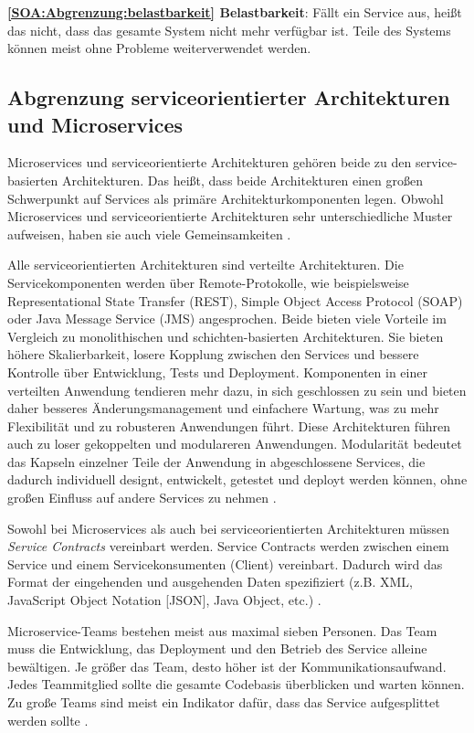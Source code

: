 \textbf{\ref{SOA:Abgrenzung:belastbarkeit} Belastbarkeit}: Fällt ein Service aus, heißt das nicht, dass das gesamte System nicht mehr verfügbar ist. Teile des Systems können meist ohne Probleme weiterverwendet werden.



\subsection{Abgrenzung serviceorientierter Architekturen und Microservices}
\label{subsec: AbgrenzungServiceorientierte}
Microservices und serviceorientierte Architekturen gehören beide zu den service-basierten Architekturen. Das heißt, dass beide Architekturen einen großen Schwerpunkt auf Services als primäre Architekturkomponenten legen. Obwohl Microservices und serviceorientierte Architekturen sehr unterschiedliche Muster aufweisen, haben sie auch viele Gemeinsamkeiten \cite{MicroservicesVSSOA}.

Alle serviceorientierten Architekturen sind verteilte Architekturen. Die Servicekomponenten werden über Remote-Protokolle, wie beispielsweise Representational State Transfer (REST), Simple Object Access Protocol (SOAP) oder Java Message Service (JMS) angesprochen.
Beide bieten viele Vorteile im Vergleich zu monolithischen und schichten-basierten Architekturen. Sie bieten höhere Skalierbarkeit, losere Kopplung zwischen den Services und bessere Kontrolle über Entwicklung, Tests und Deployment. Komponenten in einer verteilten Anwendung tendieren mehr dazu, in sich geschlossen zu sein und bieten daher besseres Änderungsmanagement und einfachere Wartung, was zu mehr Flexibilität und zu robusteren Anwendungen führt.
Diese Architekturen führen auch zu loser gekoppelten und modulareren Anwendungen. 
Modularität bedeutet das Kapseln einzelner Teile der Anwendung in abgeschlossene Services, die dadurch individuell designt, entwickelt, getestet und deployt werden können, ohne großen Einfluss auf andere Services zu nehmen \cite{MicroservicesVSSOA}.

Sowohl bei Microservices als auch bei serviceorientierten Architekturen müssen \textit{Service Contracts} vereinbart werden. Service Contracts werden zwischen einem Service und einem Servicekonsumenten (Client) vereinbart. Dadurch wird das Format der eingehenden und ausgehenden Daten spezifiziert (z.B. XML, JavaScript Object Notation [JSON], Java Object, etc.) \cite{MicroservicesVSSOA}. 

Microservice-Teams bestehen meist aus maximal sieben Personen. Das Team muss die Entwicklung, das Deployment und den Betrieb des Service alleine bewältigen. Je größer das Team, desto höher ist der Kommunikationsaufwand. Jedes Teammitglied sollte die gesamte Codebasis überblicken und warten können. Zu große Teams sind meist ein Indikator dafür, dass das Service aufgesplittet werden sollte \cite{MicroservicesVSSOA}.

